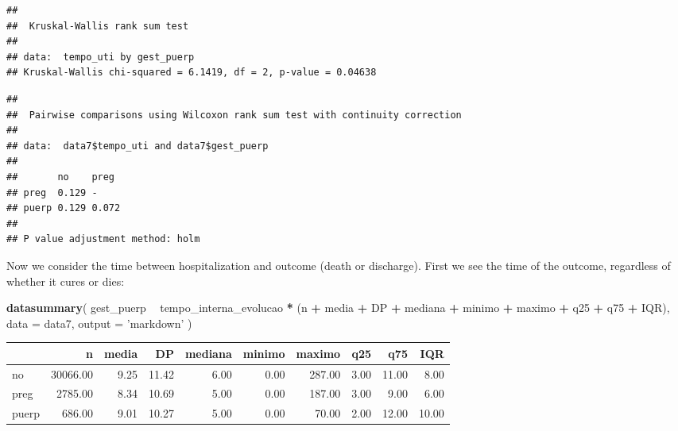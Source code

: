 \documentclass[
]{article}
\newenvironment{Shaded}{\begin{snugshade}}{\end{snugshade}}
\newcommand{\DataTypeTok}[1]{\textcolor[rgb]{0.13,0.29,0.53}{#1}}
\newcommand{\KeywordTok}[1]{\textcolor[rgb]{0.13,0.29,0.53}{\textbf{#1}}}
\newcommand{\NormalTok}[1]{#1}
\newcommand{\OperatorTok}[1]{\textcolor[rgb]{0.81,0.36,0.00}{\textbf{#1}}}
\newcommand{\StringTok}[1]{\textcolor[rgb]{0.31,0.60,0.02}{#1}}
\begin{document}
\begin{verbatim}
## 
##  Kruskal-Wallis rank sum test
## 
## data:  tempo_uti by gest_puerp
## Kruskal-Wallis chi-squared = 6.1419, df = 2, p-value = 0.04638
\end{verbatim}

\begin{Shaded}
\end{Shaded}

\begin{verbatim}
## 
##  Pairwise comparisons using Wilcoxon rank sum test with continuity correction 
## 
## data:  data7$tempo_uti and data7$gest_puerp 
## 
##       no    preg 
## preg  0.129 -    
## puerp 0.129 0.072
## 
## P value adjustment method: holm
\end{verbatim}

Now we consider the time between hospitalization and outcome (death or
discharge). First we see the time of the outcome, regardless of whether
it cures or dies:

\begin{Shaded}
\begin{Highlighting}[]
\KeywordTok{datasummary}\NormalTok{(}
\NormalTok{  gest_puerp }\OperatorTok{~}\StringTok{ }\NormalTok{tempo_interna_evolucao }\OperatorTok{*}\StringTok{ }\NormalTok{(n }\OperatorTok{+}\StringTok{ }\NormalTok{media }\OperatorTok{+}\StringTok{ }\NormalTok{DP }\OperatorTok{+}\StringTok{ }\NormalTok{mediana }\OperatorTok{+}\StringTok{ }\NormalTok{minimo }\OperatorTok{+}\StringTok{ }
\StringTok{                                           }\NormalTok{maximo }\OperatorTok{+}\StringTok{  }\NormalTok{q25 }\OperatorTok{+}\StringTok{ }\NormalTok{q75 }\OperatorTok{+}\StringTok{ }\NormalTok{IQR),}
  \DataTypeTok{data =}\NormalTok{ data7,}
  \DataTypeTok{output =} \StringTok{'markdown'}
\NormalTok{)}
\end{Highlighting}
\end{Shaded}

\begin{longtable}[]{@{}lrrrrrrrrr@{}}
\toprule
& n & media & DP & mediana & minimo & maximo & q25 & q75 &
IQR\tabularnewline
\midrule
\endhead
no & 30066.00 & 9.25 & 11.42 & 6.00 & 0.00 & 287.00 & 3.00 & 11.00 &
8.00\tabularnewline
preg & 2785.00 & 8.34 & 10.69 & 5.00 & 0.00 & 187.00 & 3.00 & 9.00 &
6.00\tabularnewline
puerp & 686.00 & 9.01 & 10.27 & 5.00 & 0.00 & 70.00 & 2.00 & 12.00 &
10.00\tabularnewline
\bottomrule
\end{longtable}
\end{document}
